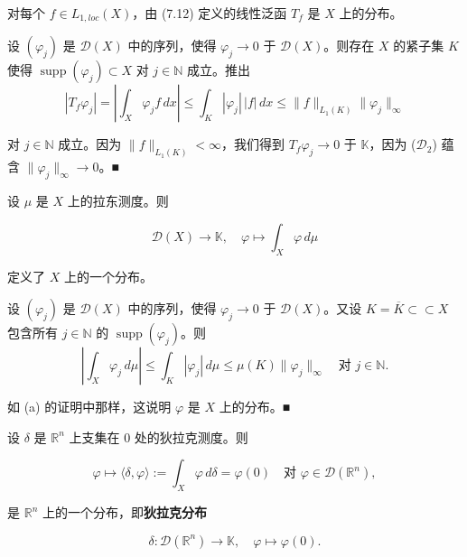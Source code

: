 \begin{example}

\begin{items}
\item

对每个 $ f \in L_{1,loc}(X) $，由 (7.12) 定义的线性泛函 $ T_{f} $ 是 $ X $ 上的分布。

\proofhead
设 $ (\varphi_{j}) $ 是 $ \mathcal{D}(X) $ 中的序列，使得 $ \varphi_{j} \to 0 $ 于 $ \mathcal{D}(X) $。则存在 $ X $ 的紧子集 $ K $ 使得 $ \operatorname{supp}(\varphi_{j}) \subset X $ 对 $ j \in \mathbb{N} $ 成立。推出
\[
|T_{f}\varphi_{j}| = \left|\int_{X}\varphi_{j}f\,dx\right| \le \int_{K}|\varphi_{j}|\,|f|\,dx \le \|f\|_{L_{1}(K)}\|\varphi_{j}\|_{\infty}
\]

对 $ j \in \mathbb{N} $ 成立。因为 $ \|f\|_{L_{1}(K)} < \infty $，我们得到 $ T_{f}\varphi_{j} \to 0 $ 于 $ \mathbb{K} $，因为 ($ \mathcal{D}_{2} $) 蕴含 $ \|\varphi_{j}\|_{\infty} \to 0 $。\nobreak\hspace{0.35em}■

\item

设 $ \mu $ 是 $ X $ 上的拉东测度。则

\[
\mathcal{D}(X) \to \mathbb{K} , \quad \varphi \mapsto \int_{X}\varphi\,d\mu
\]

定义了 $ X $ 上的一个分布。

\proofhead
设 $ (\varphi_{j}) $ 是 $ \mathcal{D}(X) $ 中的序列，使得 $ \varphi_{j} \to 0 $ 于 $ \mathcal{D}(X) $。又设 $ K = \overline{K} \subset\subset X $ 包含所有 $ j \in \mathbb{N} $ 的 $ \operatorname{supp}(\varphi_{j}) $。则
\[
\left|\int_{X}\varphi_{j}\,d\mu\right| \le \int_{K}|\varphi_{j}|\,d\mu \le \mu(K)\|\varphi_{j}\|_{\infty} \quad \text{对 } j \in \mathbb{N} .
\]

如 (a) 的证明中那样，这说明 $ \varphi $ 是 $ X $ 上的分布。\nobreak\hspace{0.35em}■

\item

设 $ \delta $ 是 $ \mathbb{R}^{n} $ 上支集在 0 处的狄拉克测度。则

\[
\varphi \mapsto \langle\delta,\varphi\rangle := \int_{X}\varphi\,d\delta = \varphi(0) \quad \text{对 } \varphi \in \mathcal{D}(\mathbb{R}^{n}) ,
\]

是 $ \mathbb{R}^{n} $ 上的一个分布，即\textbf{狄拉克分布}

\[
\delta : \mathcal{D}(\mathbb{R}^{n}) \to \mathbb{K} , \quad \varphi \mapsto \varphi(0) .
\]


\end{items}
\end{example}
